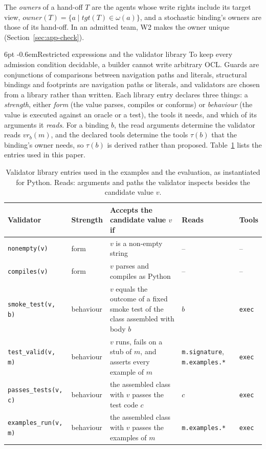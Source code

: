 \documentclass[pdflatex,sn-mathphys-num]{sn-jnl}
\makeatletter
\theoremstyle{thmstyleone}%
\theoremstyle{thmstyletwo}%
\theoremstyle{thmstylethree}%
\newcommand{\W}[1]{\textsf{W#1}}
\newcommand{\code}[1]{\texttt{#1}}
\renewcommand\paragraph{\@startsection{paragraph}{4}{\z@}%
  {6pt \@plus 2pt \@minus 1pt}{-0.6em}{\normalfont\normalsize\bfseries}}
\makeatother
\begin{document}
The \emph{owners} of a hand-off $T$ are the agents whose write rights include
its target view, $\mathit{owner}(T)=\{a\mid\mathit{tgt}(T)\in\omega(a)\}$, and
a stochastic binding's owners are those of its hand-off. In an admitted team,
\W{2} makes the owner unique (Section~\ref{sec:app-check}).

\paragraph{Restricted expressions and the validator library} To keep every
admission condition decidable, a builder cannot write arbitrary OCL. Guards are
conjunctions of comparisons between navigation paths and literals, structural
bindings and footprints are navigation paths or literals, and validators are
chosen from a library rather than written. Each library entry declares three
things: a \emph{strength}, either \emph{form} (the value parses, compiles or
conforms) or \emph{behaviour} (the value is executed against an oracle or a
test), the tools it needs, and which of its arguments it \emph{reads}. For a
binding $b$, the read arguments determine the validator reads
$\mathit{vr}_b(m)$, and the declared tools determine the tools $\tau(b)$ that
the binding's owner needs, so $\tau(b)$ is derived rather than proposed.
Table~\ref{tab:validators} lists the entries used in this paper.

\begin{table}[t]
\centering\scriptsize
\caption{Validator library entries used in the examples and the evaluation, as
instantiated for Python. Reads: arguments and paths the validator inspects
besides the candidate value $v$.}
\label{tab:validators}
\setlength{\tabcolsep}{3pt}
\begin{tabularx}{\textwidth}{@{}l l >{\raggedright\arraybackslash}X >{\raggedright\arraybackslash}p{2.3cm} l@{}}
\toprule
Validator & Strength & Accepts the candidate value $v$ if & Reads & Tools \\
\midrule
\code{nonempty(v)} & form & $v$ is a non-empty string & -- & -- \\
\code{compiles(v)} & form & $v$ parses and compiles as Python & -- & -- \\
\code{smoke\_test(v, b)} & behaviour & $v$ equals the outcome of a fixed smoke test of the class assembled with body $b$ & $b$ & \code{exec} \\
\code{test\_valid(v, m)} & behaviour & $v$ runs, fails on a stub of $m$, and asserts every example of $m$ & \code{m.signature}, \code{m.examples.*} & \code{exec} \\
\code{passes\_tests(v, c)} & behaviour & the assembled class with $v$ passes the test code $c$ & $c$ & \code{exec} \\
\code{examples\_run(v, m)} & behaviour & the assembled class with $v$ passes the examples of $m$ & \code{m.examples.*} & \code{exec} \\
\bottomrule
\end{tabularx}
\end{table}
\end{document}
